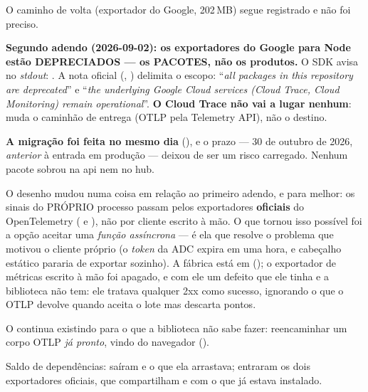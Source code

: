 O caminho de volta (exportador do Google, 202\,MB) segue registrado e não foi
preciso.

\textbf{Segundo adendo (2026-09-02): os exportadores do Google para Node estão
DEPRECIADOS --- os PACOTES, não os produtos.} O SDK avisa no \emph{stdout}:
. A nota oficial
(, )
delimita o escopo: \enquote{\emph{all packages in this repository are
deprecated}} e \enquote{\emph{the underlying Google Cloud services (Cloud
Trace, Cloud Monitoring) remain operational}}. \textbf{O Cloud Trace não vai a
lugar nenhum}: muda o caminhão de entrega (OTLP pela Telemetry API), não o
destino.

\textbf{A migração foi feita no mesmo dia} (), e o
prazo --- 30 de outubro de 2026, \emph{anterior} à entrada em produção ---
deixou de ser um risco carregado. Nenhum pacote 
sobrou na api nem no hub.

O desenho mudou numa coisa em relação ao primeiro adendo, e para melhor: os
sinais do PRÓPRIO processo passam pelos exportadores \textbf{oficiais} do
OpenTelemetry ( e
), não por cliente escrito à mão. O que tornou isso
possível foi a opção  aceitar uma \emph{função assíncrona} --- é
ela que resolve o problema que motivou o cliente próprio (o \emph{token} da
ADC expira em uma hora, e cabeçalho estático pararia de exportar sozinho). A
fábrica está em 
(); o exportador de métricas escrito à mão foi
apagado, e com ele um defeito que ele tinha e a biblioteca não tem: ele
tratava qualquer 2xx como sucesso, ignorando o  que o OTLP
devolve quando aceita o lote mas descarta pontos.

O  continua existindo para o que a biblioteca não sabe
fazer: reencaminhar um corpo OTLP \emph{já pronto}, vindo do navegador
().

Saldo de dependências: saíram 
e o  que ela arrastava; entraram os dois exportadores
oficiais, que compartilham  e  com
o que já estava instalado.

